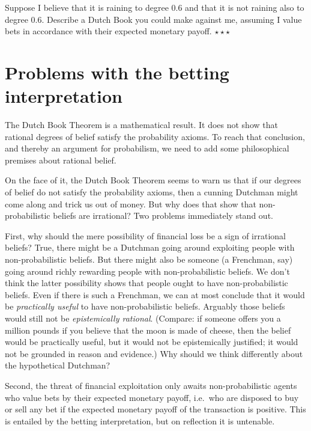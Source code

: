 
\begin{exercise}
  Suppose I believe that it is raining to degree 0.6 and that it is
  not raining also to degree 0.6. Describe a Dutch Book you could make
  against me, assuming I value bets in accordance with their expected
  monetary payoff. $\star\star\star$
\end{exercise}

\section{Problems with the betting interpretation}\label{sec:problem-betting}

The Dutch Book Theorem is a mathematical result. It does not show that
rational degrees of belief satisfy the probability axioms. To reach
that conclusion, and thereby an argument for probabilism, we need to
add some philosophical premises about rational belief.

On the face of it, the Dutch Book Theorem seems to warn us that if our
degrees of belief do not satisfy the probability axioms, then a
cunning Dutchman might come along and trick us out of money. But why
does that show that non-probabilistic beliefs are irrational?  Two
problems immediately stand out.

First, why should the mere possibility of financial loss be a sign of
irrational beliefs? True, there might be a Dutchman going around
exploiting people with non-probabilistic beliefs. But there might also
be someone (a Frenchman, say) going around richly rewarding people
with non-probabilistic beliefs. We don't think the latter possibility
shows that people ought to have non-probabilistic beliefs. Even if
there is such a Frenchman, we can at most conclude that it would be
\emph{practically useful} to have non-probabilistic beliefs. Arguably
those beliefs would still not be \emph{epistemically
  rational}. (Compare: if someone offers you a million pounds if you
believe that the moon is made of cheese, then the belief would be
practically useful, but it would not be epistemically justified;
it would not be grounded in reason and evidence.) Why should we think
differently about the hypothetical Dutchman? 

Second, the threat of financial exploitation only awaits
non-probabilistic agents who value bets by their expected monetary
payoff, i.e.\ who are disposed to buy or sell any bet if the expected
monetary payoff of the transaction is positive. This is entailed by
the betting interpretation, but on reflection it is untenable.

